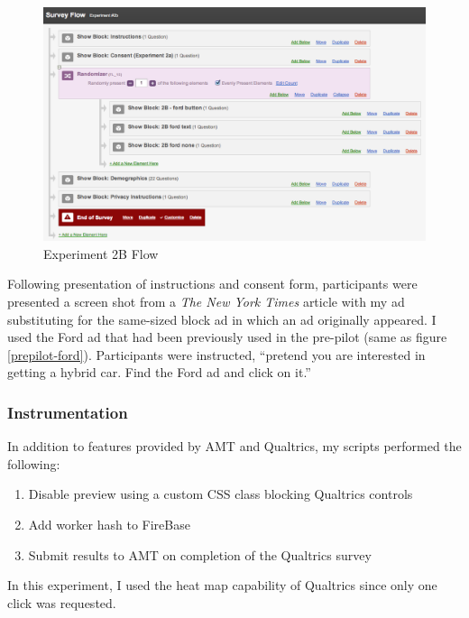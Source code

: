 \begin{figure}
\centerline{
  \includegraphics[scale=.3]{chapter6.tex/2b-flow}
  }
\caption{Experiment 2B Flow}
\label{1B-flow}
\end{figure}

Following presentation of instructions and consent form, participants were presented a screen shot from a \emph{The New York Times} article with my ad substituting for the same-sized block ad in which an ad originally appeared. I used the Ford ad that had been previously used in the pre-pilot  (same as figure \autoref{prepilot-ford}).  Participants were instructed, ``pretend you are interested in getting a hybrid car. Find the Ford ad and click on it.''

\subsubsection{Instrumentation}
\label{instrumentation}

In addition to features provided by AMT and Qualtrics, my scripts performed the following:

\begin{sloppier}
\begin{enumerate}
\item Disable preview using a custom CSS class blocking Qualtrics controls
\item Add worker hash to FireBase
\item Submit results to AMT on completion of the Qualtrics survey
\end{enumerate}
\end{sloppier}

In this experiment, I used the heat map capability of Qualtrics since only one click was requested.

